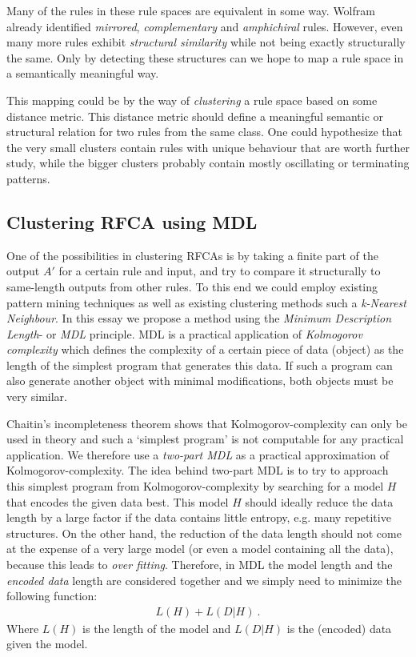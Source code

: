\documentclass{llncs}
\begin{document}
Many of the rules in these rule spaces are equivalent in some way. Wolfram already identified \emph{mirrored}, \emph{complementary} and \emph{amphichiral} rules\cite{elemca}. However, even many more rules exhibit \emph{structural similarity} while not being exactly structurally the same. Only by detecting these structures can we hope to map a rule space in a semantically meaningful way.

This mapping could be by the way of \emph{clustering} a rule space based on some distance metric. This distance metric should define a meaningful semantic or structural relation for two rules from the same class. One could hypothesize that the very small clusters contain rules with unique behaviour that are worth further study, while the bigger clusters probably contain mostly oscillating or terminating patterns.

\subsection{Clustering RFCA using MDL}
One of the possibilities in clustering RFCAs is by taking a finite part of the output $A'$ for a certain rule and input, and try to compare it structurally to same-length outputs from other rules. To this end we could employ existing pattern mining techniques as well as existing clustering methods such a \emph{k-Nearest Neighbour}. In this essay we propose a method using the \emph{Minimum Description Length}- or \emph{MDL} principle\cite{mdl}. MDL is a practical application of \emph{Kolmogorov complexity}\cite{kolmogorov}\cite{chaitin} which defines the complexity of a certain piece of data (object) as the length of the simplest program that generates this data. If such a program can also generate another object with minimal modifications, both objects must be very similar.

Chaitin's incompleteness theorem shows that Kolmogorov-complexity can only be used in theory and such a `simplest program' is not computable for any practical application. We therefore use a \emph{two-part MDL} as a practical approximation of Kolmogorov-complexity. The idea behind two-part MDL is to try to approach this simplest program from Kolmogorov-complexity by searching for a model $H$ that  encodes the given data best. This model $H$ should ideally reduce the data length by a large factor if the data contains little entropy, e.g. many repetitive structures. On the other hand, the reduction of the data length should not come at the expense of a very large model (or even a model containing all the data), because this leads to \emph{over fitting}. Therefore, in MDL the model length and the \emph{encoded data} length are considered together and we simply need to minimize the following function:
\begin{align*}
L(H) + L(D|H) \ .
\end{align*}
Where $L(H)$ is the length of the model and $L(D|H)$ is the (encoded) data given the model.
\end{document}
